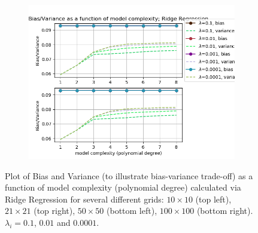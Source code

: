 \begin{figure}[!ht]
\begin{subfigure}{\textwidth}
\end{subfigure}
\begin{subfigure}{\textwidth}
  \centering
  \includegraphics[width=0.55\linewidth]{images/bias_var/fake_ridge_bv_p08_n100.png}
\end{subfigure}
\caption{Plot of Bias and Variance (to illustrate bias-variance trade-off) as a function of model complexity (polynomial degree) calculated via Ridge Regression for several different grids: $10\times10$ (top left), $21\times21$ (top right), $50\times50$ (bottom left), $100\times100$ (bottom right). $\lambda_i = 0.1$, $0.01$ and $0.0001$.}
\label{fig:ridge-bias}
\end{figure}


